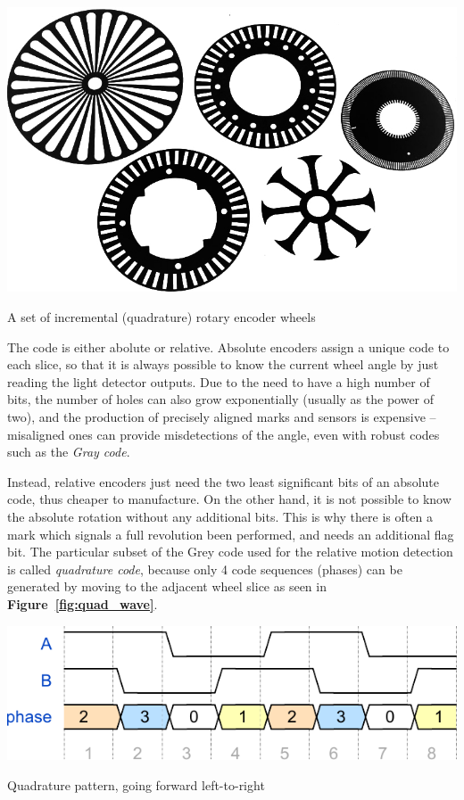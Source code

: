 \documentclass[a4paper,10pt]{article}
\makeatletter
\newenvironment{figurehere}{\def\@captype{figure}\vspace{2ex}}{\vspace{2ex}}
\newcommand{\citef}[1]{\textbf{Figure~\ref{#1}}}
\makeatother
\begin{document}
\begin{multicols}{2}
\begin{figurehere}
	\centering
	\includegraphics[keepaspectratio=true,width=0.9\columnwidth]{images/encoder_wheels.jpg}
	\caption{A set of incremental (quadrature) rotary encoder wheels}
	\label{fig:encoder_wheels}
\end{figurehere}

The code is either abolute or relative. Absolute encoders assign a unique code
to each slice, so that it is always possible to know the current wheel angle
by just reading the light detector outputs. Due to the need to have a high
number of bits, the number of holes can also grow exponentially (usually as
the power of two), and the production of precisely aligned marks and sensors
is expensive -- misaligned ones can provide misdetections of the angle, even
with robust codes such as the \emph{Gray code}.

Instead, relative encoders just need the two least significant bits of an
absolute code, thus cheaper to manufacture. On the other hand, it is not
possible to know the absolute rotation without any additional bits. This is
why there is often a mark which signals a full revolution been performed, and
needs an additional flag bit. The particular subset of the Grey code used for
the relative motion detection is called \emph{quadrature code}, because only 4
code sequences (phases) can be generated by moving to the adjacent wheel slice
as seen in \citef{fig:quad_wave}.

\begin{figurehere}
	\centering
	\includegraphics[keepaspectratio=true,width=0.9\columnwidth]{images/quad_wave.pdf}
	\caption{Quadrature pattern, going forward left-to-right}
	\label{fig:quad_wave}
\end{figurehere}


\end{multicols}
\end{document}
